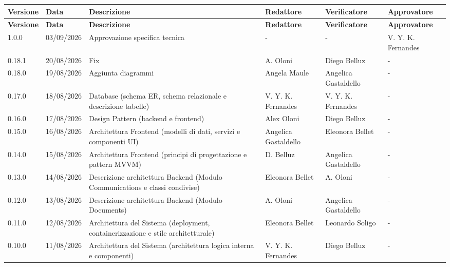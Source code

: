 \documentclass[a4paper,12pt]{article}
\begin{document}
\renewcommand{\arraystretch}{1.35}
\begin{center}
    {\footnotesize
    \begin{longtable}{|p{1.4cm}|p{1.8cm}|p{5cm}|p{2.4cm}|p{2.3cm}|p{2.3cm}|}
        \hline
        \rowcolor{gray!20}
        \textbf{Versione} & \textbf{Data} & \textbf{Descrizione} & \textbf{Redattore} & \textbf{Verificatore} & \textbf{Approvatore} \\
        \hline
        \endfirsthead
        \hline
        \rowcolor{gray!20}
        \textbf{Versione} & \textbf{Data} & \textbf{Descrizione} & \textbf{Redattore} & \textbf{Verificatore} & \textbf{Approvatore} \\
        \hline
        \endhead
        1.0.0 & 03/09/2026 & Approvazione specifica tecnica & - & - &  V. Y. K. Fernandes \\
        \hline
        0.18.1 & 20/08/2026 & Fix & A. Oloni & Diego Belluz & - \\
        \hline
        0.18.0 & 19/08/2026 & Aggiunta diagrammi & Angela Maule & Angelica Gastaldello & - \\
        \hline
        0.17.0 & 18/08/2026 & Database (schema ER, schema relazionale e descrizione tabelle) & V. Y. K. Fernandes & V. Y. K. Fernandes & - \\
        \hline
        0.16.0 & 17/08/2026 & Design Pattern (backend e frontend) & Alex Oloni & Diego Belluz & - \\
        \hline
        0.15.0 & 16/08/2026 & Architettura Frontend (modelli di dati, servizi e componenti UI) & Angelica Gastaldello & Eleonora Bellet & - \\
        \hline
        0.14.0 & 15/08/2026 & Architettura Frontend (principi di progettazione e pattern MVVM) & D. Belluz & Angelica Gastaldello & - \\
        \hline
        0.13.0 & 14/08/2026 & Descrizione architettura Backend (Modulo Communications e classi condivise) & Eleonora Bellet & A. Oloni & - \\
        \hline
        0.12.0 & 13/08/2026 & Descrizione architettura Backend (Modulo Documents) & A. Oloni & Angelica Gastaldello & - \\
        \hline
        0.11.0 & 12/08/2026 & Architettura del Sistema (deployment, containerizzazione e stile architetturale) & Eleonora Bellet & Leonardo Soligo & - \\
        \hline
        0.10.0 & 11/08/2026 & Architettura del Sistema (architettura logica interna e componenti) & V. Y. K. Fernandes & Diego Belluz & - \\

\end{longtable}}
\end{center}
\end{document}
